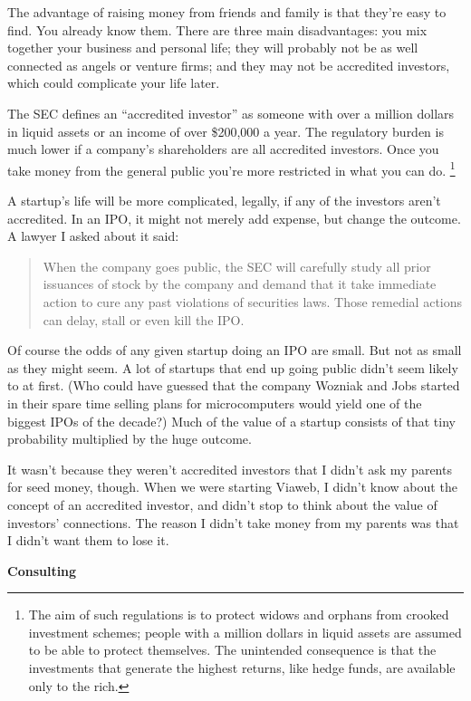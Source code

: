 The advantage of raising money from friends and family is that they're
easy to find. You already know them. There are three main disadvantages:
you mix together your business and personal life; they will probably not
be as well connected as angels or venture firms; and they may not be
accredited investors, which could complicate your life later.

The SEC defines an ``accredited investor'' as someone with over a
million dollars in liquid assets or an income of over \$200,000 a year.
The regulatory burden is much lower if a company's shareholders are all
accredited investors. Once you take money from the general public you're
more restricted in what you can do. \footnote{The aim of such regulations is to protect widows and orphans
from crooked investment schemes; people with a million dollars in liquid
assets are assumed to be able to protect themselves. The unintended
consequence is that the investments that generate the highest returns,
like hedge funds, are available only to the rich.}

A startup's life will be more complicated, legally, if any of the
investors aren't accredited. In an IPO, it might not merely add expense,
but change the outcome. A lawyer I asked about it said:

\begin{quote}
When the company goes public, the SEC will carefully study all prior
issuances of stock by the company and demand that it take immediate
action to cure any past violations of securities laws. Those remedial
actions can delay, stall or even kill the IPO.
\end{quote}

Of course the odds of any given startup doing an IPO are small. But not
as small as they might seem. A lot of startups that end up going public
didn't seem likely to at first. (Who could have guessed that the company
Wozniak and Jobs started in their spare time selling plans for
microcomputers would yield one of the biggest IPOs of the decade?) Much
of the value of a startup consists of that tiny probability multiplied
by the huge outcome.

It wasn't because they weren't accredited investors that I didn't ask my
parents for seed money, though. When we were starting Viaweb, I didn't
know about the concept of an accredited investor, and didn't stop to
think about the value of investors' connections. The reason I didn't
take money from my parents was that I didn't want them to lose it.

\textbf{Consulting}

